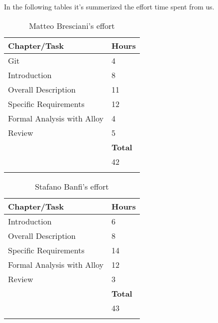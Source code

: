 In the following tables it's summerized the effort time spent from us. 
	\begin{longtable}{| p{5 cm} | p{1 cm} |} 
			\hline
			{\bf Chapter/Task} & {\bf Hours}\\
			\hline
            Git & 4 \\
			Introduction & 8 \\
			Overall Description & 11  \\
			Specific Requirements &  12 \\
			Formal Analysis with Alloy & 4  \\
			Review & 5 \\
			\hline
			&  {\bf Total} \\
			\hline
			&  42 \\
			\hline
			\caption{Matteo Bresciani's effort}
		\end{longtable}

			\begin{longtable}{| p{5 cm} | p{1 cm} |} 
			\hline
			{\bf Chapter/Task} & {\bf Hours}\\
			\hline
			Introduction & 6 \\
			Overall Description & 8 \\
			Specific Requirements & 14 \\
			Formal Analysis with Alloy & 12 \\
			Review & 3 \\
			\hline
			&  {\bf Total} \\
			\hline
			&  43 \\
			\hline
			\caption{Stafano Banfi's effort}
		\end{longtable}
	